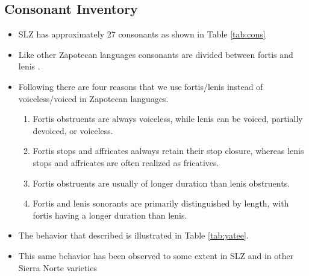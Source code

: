 \documentclass[12pt, letterpaper]{article}
\begin{document}
\subsection*{Consonant Inventory} \label{sec:Consonants}

\begin{itemize}
	\item SLZ has approximately 27 consonants as shown in Table \ref{tab:cons}

	\item Like other Zapotecan languages consonants are divided between fortis and lenis \citep{nellisFortisLenisCajonos1980,jaegerInitialConsonantClusters1982,uchiharaFortisLenisGlides2016}.

	\item Following \citet{jaegerInitialConsonantClusters1982} there are four reasons that we use fortis/lenis instead of voiceless/voiced in Zapotecan languages.
	\begin{enumerate}
		\item Fortis obstruents are always voiceless, while lenis can be voiced, partially devoiced, or voiceless.
		\item Fortis stops and affricates aalways retain their stop closure, whereas lenis stops and affricates are often realized as fricatives.
		\item Fortis obstruents are usually of longer duration than lenis obstruents.
		\item Fortis and lenis sonorants are primarily distinguished by length, with fortis having a longer duration than lenis. 
	\end{enumerate}
	\item The behavior that \citet{jaegerInitialConsonantClusters1982} described is illustrated in Table \ref{tab:yatee}. 
	\item This same behavior has been observed to some extent in SLZ and in other Sierra Norte varieties \citep{sonnenscheinDescriptiveGrammarSan2005}
\end{itemize}
\end{document}
